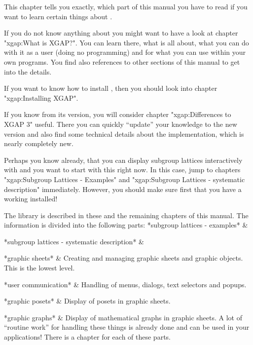 
This chapter tells you exactly, which part of this manual you have to read
if you want to learn certain things about \XGAP.

If you do not know anything about {\XGAP} you might want to have a look at
chapter "xgap:What is XGAP?". You can learn there, what {\XGAP} is all
about, what you can do with it as a user (doing no programming) and for
what you can use {\XGAP} within your own programs. You find also references
to other sections of this manual to get into the details.

If you want to know how to install \XGAP, then you should look into 
chapter "xgap:Installing XGAP".

If you know {\XGAP} from its  version, you will consider chapter
"xgap:Differences to XGAP 3" useful. There you can quickly ``update'' your
knowledge to the new  version and also find some technical details
about the implementation, which is nearly completely new.

Perhaps you know already, that you can display subgroup lattices
interactively with {\XGAP} and you want to start with this right now. In
this case, jump to chapters "xgap:Subgroup Lattices - Examples" and
"xgap:Subgroup Lattices - systematic description"
immediately. However, you should make sure first that you have a working
{\XGAP} installed! 

The {\XGAP} library is described in these and the remaining chapters of this
manual. The information is divided into the following parts:
\beginitems
*subgroup lattices - examples* &
  
*subgroup lattices - systematic description* &

*graphic sheets* &
  Creating and managing graphic sheets and graphic objects. This is the
  lowest level.

*user communication* &
  Handling of menus, dialogs, text selectors and popups.

*graphic posets* &
  Display of posets in graphic sheets.

*graphic graphs* &
  Display of mathematical graphs in graphic sheets. A lot of ``routine
  work'' for handling these things is already done and can be used in
  your applications!
\enditems
There is a chapter for each of these parts.



